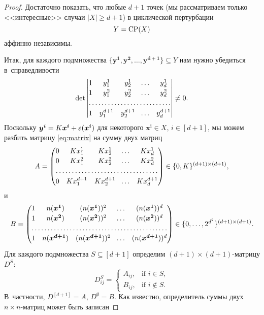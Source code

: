 \begin{proof}
	Достаточно показать, что любые $d+1$ точек (мы рассматриваем только <<интересные>> случаи $|X| \ge d+1$) 
	в циклической пертурбации 
	\[
	Y = \textup{CP}(X)
	\]
	аффинно независимы.
	
	Итак, для каждого подмножества $\{\bm{y^1}, \bm{y^2}, \dots, \bm{y^{d+1}}\} \subseteq Y$ нам нужно убедиться в~справедливости
	\begin{equation}
	\label{eq:matrix}
	\det\begin{vmatrix}
	1 & y^1_1 & y^1_2 & \!\dots & y^1_d \\[2pt]
	1 & y^2_1 & y^2_2 & \!\dots & y^2_d \\[2pt]
	\hdotsfor[1]{5} \\[2pt]
	1 & y^{d+1}_1 & y^{d+1}_2 & \!\dots & y^{d+1}_d
	\end{vmatrix} \ne 0.
	\end{equation}
	Поскольку $\bm{y^i} = K \bm{x^i} + \varepsilon(\bm{x^i})$ для некоторого $\bm{x^i} \in X$, $i\in[d+1]$,
	мы можем разбить матрицу \eqref{eq:matrix} на сумму двух матриц
	\[
	A = \begin{pmatrix}
	0 & K x^1_1 & K x^1_2 & \!\dots & K x^1_d \\[2pt]
	0 & K x^2_1 & K x^2_2 & \!\dots & K x^2_d \\[2pt]
	\hdotsfor[1]{5} \\[2pt]
	0 & K x^{d+1}_1 & K x^{d+1}_2 & \!\dots & K x^{d+1}_d
	\end{pmatrix} \in \{0, K\}^{(d+1)\times(d+1)},
	\]
	и
	\[
	B = \begin{pmatrix}
	1 & n(\bm{x^1}) & (n(\bm{x^1}))^2 & \!\dots & (n(\bm{x^1}))^d \\[2pt]
	1 & n(\bm{x^2}) & (n(\bm{x^2}))^2 & \!\dots & (n(\bm{x^2}))^d \\[2pt]
	\hdotsfor[1]{5} \\[2pt]
	1 & n(\bm{x^{d+1}}) & (n(\bm{x^{d+1}}))^2 & \!\dots & (n(\bm{x^{d+1}}))^d \\[2pt]
	\end{pmatrix} \in \{0,\dots,2^{d^2}\}^{(d+1)\times(d+1)}.
	\]
	Для каждого подмножества $S\subseteq[d+1]$ определим $(d+1)\times (d+1)$-матрицу $D^S$:
	\[
	D^S_{ij} = 
	\begin{cases}
	A_{ij},& \text{if } i\in S,\\
	B_{ij},& \text{if } i\not\in S.
	\end{cases}
	\]
	В~частности, $D^{[d+1]} = A$, $D^{\emptyset} = B$.
	Как известно, определитель суммы двух $n\times n$-матриц может быть записан

\end{proof}
